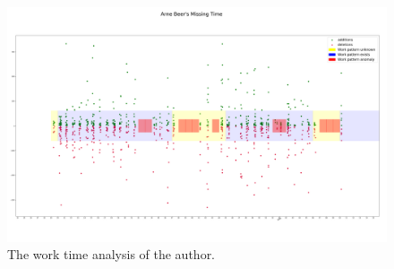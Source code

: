 \begin{figure}[H]
    \includegraphics[scale=0.21]{./graphs/analysis/work-time-analysis}
    \centering
    \caption{The work time analysis of the author.}\label{fig:missing-time}
\end{figure}

